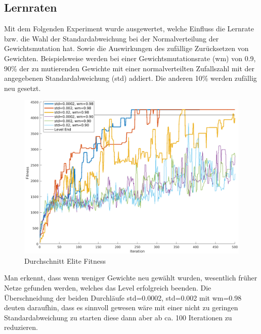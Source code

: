 \documentclass{hbrs-ecta-report}
\begin{document}
\subsection{Lernraten}
Mit dem Folgenden Experiment wurde ausgewertet, welche Einfluss die Lernrate bzw. die Wahl der Standardabweichung bei der Normalverteilung der Gewichtsmutation hat. Sowie die Auswirkungen des zufällige Zurücksetzen von Gewichten. 
Beispielsweise werden bei einer Gewichtsmutationsrate (wm) von 0.9, 90\% der zu mutierenden Gewichte mit einer normalverteilten Zufallszahl mit der angegebenen Standardabweichung (std) addiert. Die anderen 10\% werden zufällig neu gesetzt.

\begin{figure}[ht!]
	\centering
	\includegraphics[width=\linewidth]{img/learningRates.png}
	\caption{Durchschnitt Elite Fitness}
	\label{fig:learningRates} 
\end{figure}

Man erkennt, dass wenn weniger Gewichte neu gewählt wurden, wesentlich früher Netze gefunden werden, welches das Level erfolgreich beenden.
Die Überschneidung der beiden Durchläufe std=0.0002, std=0.002 mit wm=0.98 deuten daraufhin, dass es sinnvoll gewesen wäre mit einer nicht zu geringen Standardabweichung zu starten diese dann aber ab ca. 100 Iterationen zu reduzieren.
\end{document}
